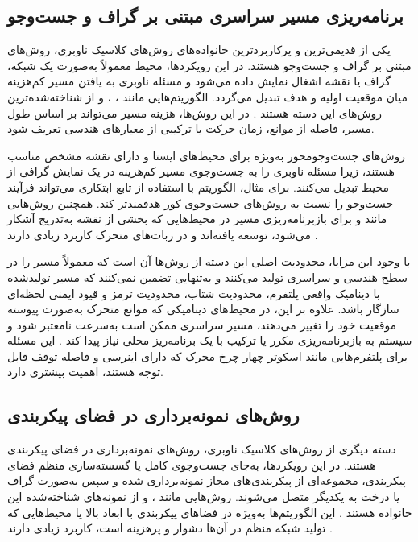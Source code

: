 \subsection{برنامه‌ریزی مسیر سراسری مبتنی بر گراف و جست‌وجو}

یکی از قدیمی‌ترین و پرکاربردترین خانواده‌های روش‌های کلاسیک ناوبری، روش‌های مبتنی بر گراف و جست‌وجو هستند. در این رویکردها، محیط معمولاً به‌صورت یک شبکه، گراف یا نقشه اشغال نمایش داده می‌شود و مسئله ناوبری به یافتن مسیر کم‌هزینه میان موقعیت اولیه و هدف تبدیل می‌گردد. الگوریتم‌هایی مانند ، ،  و  از شناخته‌شده‌ترین روش‌های این دسته هستند%
\cite{Dijkstra1959,Hart1968AStar,koenig2005dstar}.
در این روش‌ها، هزینه مسیر می‌تواند بر اساس طول مسیر، فاصله از موانع، زمان حرکت یا ترکیبی از معیارهای هندسی تعریف شود.

روش‌های جست‌وجومحور به‌ویژه برای محیط‌های ایستا و دارای نقشه مشخص مناسب هستند، زیرا مسئله ناوبری را به جست‌وجوی مسیر کم‌هزینه در یک نمایش گرافی از محیط تبدیل می‌کنند. برای مثال، الگوریتم  با استفاده از تابع ابتکاری می‌تواند فرآیند جست‌وجو را نسبت به روش‌های جست‌وجوی کور هدفمندتر کند. همچنین روش‌هایی مانند  و  برای بازبرنامه‌ریزی مسیر در محیط‌هایی که بخشی از نقشه به‌تدریج آشکار می‌شود، توسعه یافته‌اند و در ربات‌های متحرک کاربرد زیادی دارند%
\cite{koenig2005dstar,ferguson2008motion_planning}.

با وجود این مزایا، محدودیت اصلی این دسته از روش‌ها آن است که معمولاً مسیر را در سطح هندسی و سراسری تولید می‌کنند و به‌تنهایی تضمین نمی‌کنند که مسیر تولیدشده با دینامیک واقعی پلتفرم، محدودیت شتاب، محدودیت ترمز و قیود ایمنی لحظه‌ای سازگار باشد. علاوه بر این، در محیط‌های دینامیکی که موانع متحرک به‌صورت پیوسته موقعیت خود را تغییر می‌دهند، مسیر سراسری ممکن است به‌سرعت نامعتبر شود و سیستم به بازبرنامه‌ریزی مکرر یا ترکیب با یک برنامه‌ریز محلی نیاز پیدا کند%
\cite{LaValle2006Planning,choset2005principles}.
این مسئله برای پلتفرم‌هایی مانند اسکوتر چهار چرخ محرک که دارای اینرسی و فاصله توقف قابل توجه هستند، اهمیت بیشتری دارد.

\subsection{روش‌های نمونه‌برداری در فضای پیکربندی}

دسته دیگری از روش‌های کلاسیک ناوبری، روش‌های نمونه‌برداری در فضای پیکربندی هستند. در این رویکردها، به‌جای جست‌وجوی کامل یا گسسته‌سازی منظم فضای پیکربندی، مجموعه‌ای از پیکربندی‌های مجاز نمونه‌برداری شده و سپس به‌صورت گراف یا درخت به یکدیگر متصل می‌شوند. روش‌هایی مانند ،  و  از نمونه‌های شناخته‌شده این خانواده هستند%
\cite{Kavraki1996PRM,LaValle1998RRT,Karaman2011RRTstar}.
این الگوریتم‌ها به‌ویژه در فضاهای پیکربندی با ابعاد بالا یا محیط‌هایی که تولید شبکه منظم در آن‌ها دشوار و پرهزینه است، کاربرد زیادی دارند%
\cite{LaValle2006Planning,Choset2005Principles}.

